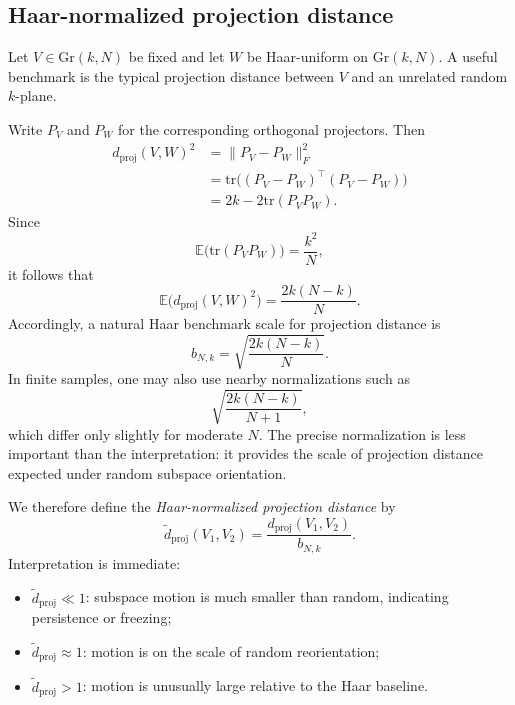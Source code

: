 \documentclass[11pt,letterpaper]{article}
\newcommand{\gr}{\mathrm{Gr}}
\newcommand{\tr}{\mathrm{tr}}
\begin{document}
\subsection{Haar-normalized projection distance}
\label{subsec:haar_norm}

Let $V\in \gr(k,N)$ be fixed and let $W$ be Haar-uniform on $\gr(k,N)$. A useful benchmark is the typical projection distance between $V$ and an unrelated random $k$-plane.

Write $P_V$ and $P_W$ for the corresponding orthogonal projectors. Then
\begin{equation*}
\begin{split}
d_{\mathrm{proj}}(V,W)^2&=\|P_V-P_W\|_F^2 \\
&=\tr\bigl((P_V-P_W)^\top(P_V-P_W)\bigr) \\
&=2k - 2\tr(P_VP_W).
\end{split}
\end{equation*}
Since
\begin{equation*}
\mathbb{E}\big(\tr(P_VP_W)\big) = \frac{k^2}{N},
\end{equation*}
it follows that
\begin{equation*}
\mathbb{E}\big(d_{\mathrm{proj}}(V,W)^2\big)=\frac{2k(N-k)}{N}.
\end{equation*}
Accordingly, a natural Haar benchmark scale for projection distance is
\begin{equation*}
b_{N,k}=\sqrt{\frac{2k(N-k)}{N}}.
\end{equation*}
In finite samples, one may also use nearby normalizations such as
\begin{equation*}
\sqrt{\frac{2k(N-k)}{N+1}},
\end{equation*}
which differ only slightly for moderate $N$. The precise normalization is less important than the interpretation: it provides the scale of projection distance expected under random subspace orientation.

We therefore define the \emph{Haar-normalized projection distance} by
\begin{equation*}
\widetilde d_{\mathrm{proj}}(V_1,V_2) = \frac{d_{\mathrm{proj}}(V_1,V_2)}{b_{N,k}}.
\end{equation*}
Interpretation is immediate:
\begin{itemize}
\item[(i)] $\widetilde d_{\mathrm{proj}}\ll 1$: subspace motion is much smaller than random, indicating persistence or freezing;
\item[(ii)] $\widetilde d_{\mathrm{proj}}\approx 1$: motion is on the scale of random reorientation;
\item[(iii)] $\widetilde d_{\mathrm{proj}}>1$: motion is unusually large relative to the Haar baseline.
\end{itemize}
\end{document}
